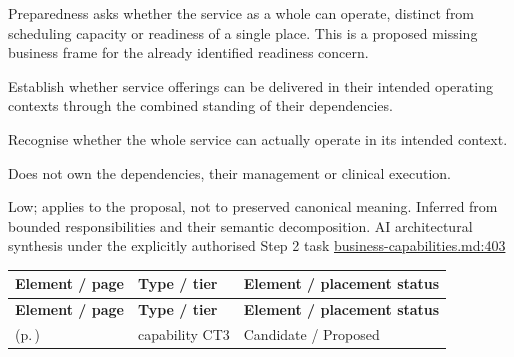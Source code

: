 Preparedness asks whether the service as a whole can operate, distinct from scheduling capacity or readiness of a single place. This is a proposed missing business frame for the already identified readiness concern.



Establish whether service offerings can be delivered in their intended operating contexts through the combined standing of their dependencies.



Recognise whether the whole service can actually operate in its intended context.



Does not own the dependencies, their management or clinical execution.


Low; applies to the proposal, not to preserved canonical meaning.
Inferred from bounded responsibilities and their semantic decomposition. AI architectural synthesis under the explicitly authorised Step 2 task \hyperref[evidence:a4c0900c47c945d9]{business-capabilities.md:403}
\begingroup\small\setlength{\TableWidth}{\dimexpr\linewidth-6\tabcolsep-4\arrayrulewidth\relax}
\begin{longtable}{|>{\raggedright\arraybackslash}p{0.52\TableWidth}|>{\raggedright\arraybackslash}p{0.2\TableWidth}|>{\raggedright\arraybackslash}p{0.28\TableWidth}|}
\hline\rowcolor{TableHead}\textbf{Element / page} & \textbf{Type / tier} & \textbf{Element / placement status}\\\hline\endfirsthead
\hline\rowcolor{TableHead}\textbf{Element / page} & \textbf{Type / tier} & \textbf{Element / placement status}\\\hline\endhead
\hline\endfoot
\nameref{cap:bc-health-service-operational-readiness} (p.\,\pageref{cap:bc-health-service-operational-readiness}) & capability CT3 & Candidate / Proposed\\\hline
\end{longtable}\endgroup


